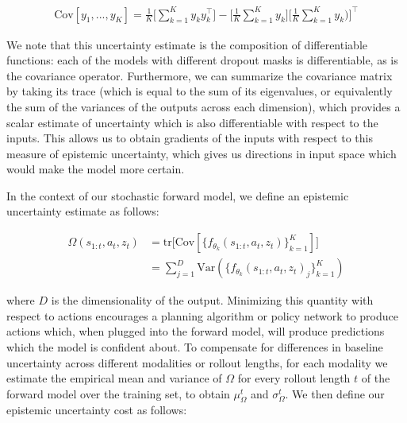 \documentclass{article} %
\begin{document}
    \begin{align}
      \mbox{Cov}[y_1, ..., y_K] = \frac{1}{K} \Big[ \sum_{k=1}^K y_k y_k^\top \Big] - \Big[ \frac{1}{K}\sum_{k=1}^K y_k \Big] \Big[\frac{1}{K}\sum_{k=1}^K y_k)\Big]^\top
    \end{align}

    We note that this uncertainty estimate is the composition of differentiable functions: each of the models with different dropout masks is differentiable, as is the covariance operator.
    Furthermore, we can summarize the covariance matrix by taking its trace (which is equal to the sum of its eigenvalues, or equivalently the sum of the variances of the outputs across each dimension), which provides a scalar estimate of uncertainty which is also differentiable with respect to the inputs.
    This allows us to obtain gradients of the inputs with respect to this measure of epistemic uncertainty, which gives us directions in input space which would make the model more certain.

    In the context of our stochastic forward model, we define an epistemic uncertainty estimate as follows:

    \begin{align*}
      \Omega(s_{1:t}, a_t, z_t) &= \mbox{tr} \Big[ \mbox{Cov} [\{ f_{\theta_k}(s_{1:t}, a_t, z_t) \}_{k=1}^K] \Big] \\
      &= \sum_{j=1}^D \mbox{Var}(\{ f_{\theta_k}(s_{1:t}, a_t, z_t)_j \}_{k=1}^K)
    \end{align*}

    where $D$ is the dimensionality of the output. Minimizing this quantity with respect to actions encourages a planning algorithm or policy network to produce actions which, when plugged into the forward model, will produce predictions which the model is confident about.
    To compensate for differences in baseline uncertainty across different modalities or rollout lengths, for each modality we estimate the empirical mean and variance of $\Omega$ for every rollout length $t$ of the forward model over the training set, to obtain $\mu_{\Omega}^t$ and $\sigma_{\Omega}^t$. We then define our epistemic uncertainty cost as follows:
\end{document}
